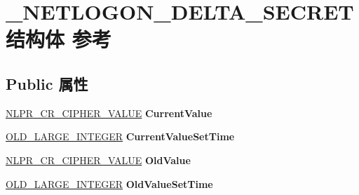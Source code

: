 \hypertarget{struct___n_e_t_l_o_g_o_n___d_e_l_t_a___s_e_c_r_e_t}{}\section{\+\_\+\+N\+E\+T\+L\+O\+G\+O\+N\+\_\+\+D\+E\+L\+T\+A\+\_\+\+S\+E\+C\+R\+E\+T结构体 参考}
\label{struct___n_e_t_l_o_g_o_n___d_e_l_t_a___s_e_c_r_e_t}
\subsection*{Public 属性}
\begin{DoxyCompactItemize}
\item 
\mbox{\label{struct___n_e_t_l_o_g_o_n___d_e_l_t_a___s_e_c_r_e_t_ab9b989c079b80d801f9395f4b4d6f67f}} 
\hyperlink{struct___n_l_p_r___c_r___c_i_p_h_e_r___v_a_l_u_e}{N\+L\+P\+R\+\_\+\+C\+R\+\_\+\+C\+I\+P\+H\+E\+R\+\_\+\+V\+A\+L\+UE} {\bfseries Current\+Value}
\item 
\mbox{\label{struct___n_e_t_l_o_g_o_n___d_e_l_t_a___s_e_c_r_e_t_a063a045c66843c4ea1ca2db9ed06f133}} 
\hyperlink{struct___o_l_d___l_a_r_g_e___i_n_t_e_g_e_r}{O\+L\+D\+\_\+\+L\+A\+R\+G\+E\+\_\+\+I\+N\+T\+E\+G\+ER} {\bfseries Current\+Value\+Set\+Time}
\item 
\mbox{\label{struct___n_e_t_l_o_g_o_n___d_e_l_t_a___s_e_c_r_e_t_adc495ae664b38b8e2ea49b674dd6f42c}} 
\hyperlink{struct___n_l_p_r___c_r___c_i_p_h_e_r___v_a_l_u_e}{N\+L\+P\+R\+\_\+\+C\+R\+\_\+\+C\+I\+P\+H\+E\+R\+\_\+\+V\+A\+L\+UE} {\bfseries Old\+Value}
\item 
\mbox{\label{struct___n_e_t_l_o_g_o_n___d_e_l_t_a___s_e_c_r_e_t_a4c5d6d3f0def9c5eb3b224406ec5f468}} 
\hyperlink{struct___o_l_d___l_a_r_g_e___i_n_t_e_g_e_r}{O\+L\+D\+\_\+\+L\+A\+R\+G\+E\+\_\+\+I\+N\+T\+E\+G\+ER} {\bfseries Old\+Value\+Set\+Time}
\item 
\mbox{\label{struct___n_e_t_l_o_g_o_n___d_e_l_t_a___s_e_c_r_e_t_a47bc702ccb3c61b255aa913219bb5fb4}} 

\end{DoxyCompactItemize}
